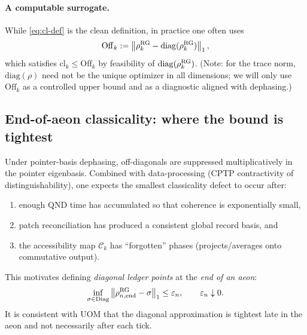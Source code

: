 \documentclass[11pt]{article}
\theoremstyle{definition}
\theoremstyle{plain}
\theoremstyle{remark}
\newcommand{\cC}{\mathcal C}
\newcommand{\diag}{\mathrm{diag}}
\newcommand{\norm}[1]{\left\lVert #1\right\rVert}
\begin{document}
\paragraph{A computable surrogate.}
While \eqref{eq:cl-def} is the clean definition, in practice one often uses
\begin{equation}
\mathrm{Off}_k:=\norm{\rho_k^{\rm RG}-\diag(\rho_k^{\rm RG})}_1,
\label{eq:off-def}
\end{equation}
which satisfies $\mathrm{cl}_k\le \mathrm{Off}_k$ by feasibility of $\diag(\rho_k^{\rm RG})$.
(Note: for the trace norm, $\diag(\rho)$ need not be the unique optimizer in all dimensions; we will only use
$\mathrm{Off}_k$ as a controlled upper bound and as a diagnostic aligned with dephasing.)

\subsection{End-of-aeon classicality: where the bound is tightest}
\label{subsec:end-of-aeon}

Under pointer-basis dephasing, off-diagonals are suppressed multiplicatively in the pointer eigenbasis. Combined with
data-processing (CPTP contractivity of distinguishability), one expects the smallest classicality defect to occur after:
\begin{enumerate}[leftmargin=2em]
\item enough QND time has accumulated so that coherence is exponentially small,
\item patch reconciliation has produced a consistent global record basis, and
\item the accessibility map $\cC_k$ has ``forgotten'' phases (projects/averages onto commutative output).
\end{enumerate}
This motivates defining \emph{diagonal ledger points} at the \emph{end of an aeon}:
\begin{equation}
\inf_{\sigma\in\mathrm{Diag}}\norm{\rho_{n,{\rm end}}^{\rm RG}-\sigma}_1\le \varepsilon_n,
\qquad \varepsilon_n\downarrow 0.
\label{eq:end-classicality}
\end{equation}
It is consistent with UOM that the diagonal approximation is tightest late in the aeon and not necessarily after each tick.
\end{document}

